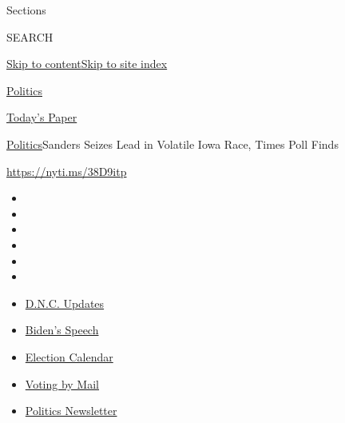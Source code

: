 Sections

SEARCH

\protect\hyperlink{site-content}{Skip to
content}\protect\hyperlink{site-index}{Skip to site index}

\href{https://www.nytimes3xbfgragh.onion/section/politics}{Politics}

\href{https://myaccount.nytimes3xbfgragh.onion/auth/login?response_type=cookie\&client_id=vi}{}

\href{https://www.nytimes3xbfgragh.onion/section/todayspaper}{Today's
Paper}

\href{/section/politics}{Politics}\textbar{}Sanders Seizes Lead in
Volatile Iowa Race, Times Poll Finds

\url{https://nyti.ms/38D9itp}

\begin{itemize}
\item
\item
\item
\item
\item
\item
\end{itemize}

\begin{itemize}
\item
  \href{https://www.nytimes3xbfgragh.onion/live/2020/08/20/us/dnc-convention-election?action=click\&pgtype=Article\&state=default\&region=TOP_BANNER\&context=storylines_menu}{D.N.C.
  Updates}
\item
  \href{https://www.nytimes3xbfgragh.onion/2020/08/20/us/politics/biden-presidential-nomination-dnc.html?action=click\&pgtype=Article\&state=default\&region=TOP_BANNER\&context=storylines_menu}{Biden's
  Speech}
\item
  \href{https://www.nytimes3xbfgragh.onion/interactive/2019/us/elections/2020-presidential-election-calendar.html?action=click\&pgtype=Article\&state=default\&region=TOP_BANNER\&context=storylines_menu}{Election
  Calendar}
\item
  \href{https://www.nytimes3xbfgragh.onion/interactive/2020/08/11/us/politics/vote-by-mail-us-states.html?action=click\&pgtype=Article\&state=default\&region=TOP_BANNER\&context=storylines_menu}{Voting
  by Mail}
\item
  \href{https://www.nytimes3xbfgragh.onion/newsletters/politics?action=click\&pgtype=Article\&state=default\&region=TOP_BANNER\&context=storylines_menu}{Politics
  Newsletter}
\end{itemize}

